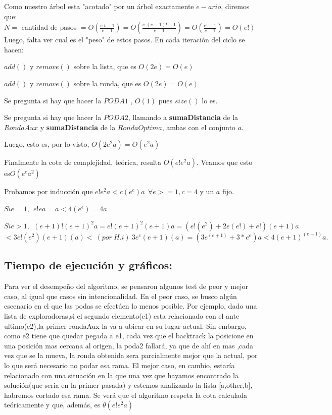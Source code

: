 \documentclass[10pt, a4paper]{article}
\begin{document}
Como nuestro árbol esta "acotado" por un árbol exactamente  $e-ario$, diremos que:\\

\hspace{30mm}$N = $ cantidad de pasos $= O(\frac{e.t -1}{e-1}) = O(\frac{e.(e-1)! -1}{e-1}) = O(\frac{e! -1}{e-1}) = O(e!)$\\

Luego, falta ver cual es el "peso" de estos pasos. En cada iteración del ciclo se hacen:

$add()$ y $remove()$ sobre la lista, que es $O(2e) = O(e)$

$add()$ y $remove()$ sobre la ronda, que es $O(2e) = O(e)$

Se pregunta si hay que hacer la $PODA1$ , $O(1)$ pues $size()$ lo es.

Se pregunta si hay que hacer la $PODA2$, llamando a \textbf{sumaDistancia} de la $RondaAux$ y \textbf{sumaDistancia} de la $RondaOptima$, ambas con el conjunto $a$. 

Luego, esto es, por lo visto, $O(2e^{2}a) = O(e^{2}a)$

Finalmente la cota de complejidad, teórica, resulta $O(e!e^{2}a)$. Veamos que esto es$ O(e^{e}a^{2})$

Probamos por inducción que $e!e^{2}a < c(e^e)a \ \ \forall e >=1 , c = 4 $ y un $a$ fijo.

$Si e = 1,\ \  e!ea = a < 4(e^{e})=4a$

$Si e > 1, \ \  (e+1)!(e+1)^{2}a = e!(e+1)^{2}(e+1)a = (e!(e^{2}) + 2e(e!) + e!)(e+1)a $\\

 $< 3e!(e^{2})(e+1)(a)<\ (por \  H.i) \ 3e^{e}(e+1)(a) = (3e^{(e+1)} + 3*e^{e})a < 4(e+1)^{(e+1)}a.$


\subsection{Tiempo de ejecución y gráficos:}

Para ver el desempeño del algoritmo, se pensaron algunos test de peor y mejor caso, al igual que casos sin intencionalidad. 
En el peor caso, se busco algún escenario en el que las podas se efectúen lo menos posible. Por ejemplo, dado una lista de exploradoras,si el segundo elemento(e1) esta relacionado con el ante ultimo(e2),la primer rondaAux la va a ubicar en su lugar actual. Sin embargo, como e2 tiene que quedar pegada a e1, cada vez que el backtrack la posicione en una posición mas cercana al origen, la poda2 fallará, ya que de ahí en mas ,cada vez que se la mueva, la ronda obtenida sera parcialmente mejor que la actual, por lo que será necesario no podar esa rama.
El mejor caso, en cambio, estaría relacionado con una situación en la que una vez que hayamos encontrado la solución(que seria en la primer pasada) y estemos analizando la lista [a,other,b], habremos cortado esa rama.
Se verá que el algoritmo respeta la cota calculada teóricamente y que, además, es $\theta(e!e^{2}a)$
		
\end{document}
